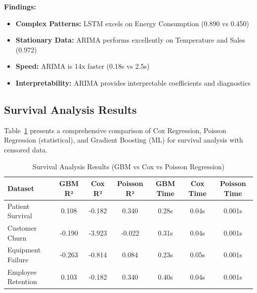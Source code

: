 \documentclass[11pt,a4paper]{article}
\begin{document}
\textbf{Findings:}
\begin{itemize}
    \item \textbf{Complex Patterns:} LSTM excels on Energy Consumption (0.890 vs 0.450)
    \item \textbf{Stationary Data:} ARIMA performs excellently on Temperature and Sales (0.972)
    \item \textbf{Speed:} ARIMA is 14x faster (0.18s vs 2.5s)
    \item \textbf{Interpretability:} ARIMA provides interpretable coefficients and diagnostics
\end{itemize}

\subsection{Survival Analysis Results}

Table~\ref{tab:survival_results} presents a comprehensive comparison of Cox Regression, Poisson Regression (statistical), and Gradient Boosting (ML) for survival analysis with censored data.

\begin{table}[h]
\centering
\begin{tabular}{lcccccc}
\toprule
\textbf{Dataset} & \textbf{GBM R²} & \textbf{Cox R²} & \textbf{Poisson R²} & \textbf{GBM Time} & \textbf{Cox Time} & \textbf{Poisson Time} \\
\midrule
Patient Survival & 0.108 & -0.182 & \textcolor{accentcolor}{0.340} & 0.28s & 0.04s & \textcolor{statcolor}{0.001s} \\
Customer Churn & -0.190 & -3.923 & \textcolor{accentcolor}{-0.022} & 0.31s & 0.04s & \textcolor{statcolor}{0.001s} \\
Equipment Failure & -0.263 & -0.814 & \textcolor{accentcolor}{0.084} & 0.23s & 0.05s & \textcolor{statcolor}{0.001s} \\
Employee Retention & 0.103 & -0.182 & \textcolor{accentcolor}{0.340} & 0.40s & 0.04s & \textcolor{statcolor}{0.001s} \\
\bottomrule
\end{tabular}
\caption{Survival Analysis Results (GBM vs Cox vs Poisson Regression)}
\label{tab:survival_results}
\end{table}
\end{document}
